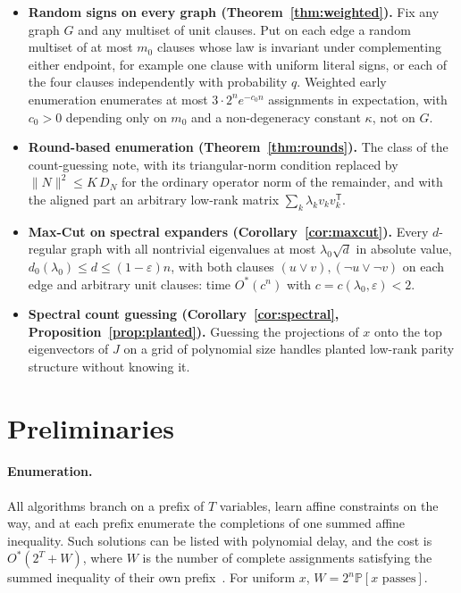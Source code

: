 \documentclass[11pt,a4paper]{article}
\theoremstyle{definition}
\theoremstyle{remark}
\newcommand{\Ostar}{O^{*}}
\newcommand{\Prb}{\mathbb P}
\begin{document}
\begin{itemize}
\item \textbf{Random signs on every graph (Theorem~\ref{thm:weighted}).} Fix
any graph $G$ and any multiset of unit clauses. Put on each edge a random
multiset of at most $m_0$ clauses whose law is invariant under complementing
either endpoint, for example one clause with uniform literal signs, or each of
the four clauses independently with probability $q$. Weighted early enumeration
enumerates at most $3\cdot2^ne^{-c_0n}$ assignments in expectation, with $c_0>0$
depending only on $m_0$ and a non-degeneracy constant $\kappa$, not on $G$.
\item \textbf{Round-based enumeration (Theorem~\ref{thm:rounds}).} The class of
the count-guessing note, with its triangular-norm condition replaced by
$\|N\|^2\le K\,D_N$ for the ordinary operator norm of the remainder, and with
the aligned part an arbitrary low-rank matrix $\sum_k\lambda_kv_kv_k^{\mathsf T}$.
\item \textbf{Max-Cut on spectral expanders (Corollary~\ref{cor:maxcut}).}
Every $d$-regular graph with all nontrivial eigenvalues at most $\lambda_0\sqrt d$
in absolute value, $d_0(\lambda_0)\le d\le(1-\varepsilon)n$, with both clauses
$(u\lor v),(\neg u\lor\neg v)$ on each edge and arbitrary unit clauses: time
$\Ostar(c^n)$ with $c=c(\lambda_0,\varepsilon)<2$.
\item \textbf{Spectral count guessing (Corollary~\ref{cor:spectral},
Proposition~\ref{prop:planted}).} Guessing the projections of $x$ onto the top
eigenvectors of $J$ on a grid of polynomial size handles planted low-rank parity
structure without knowing it.
\end{itemize}

\section{Preliminaries}\label{sec:prelim}

\paragraph{Enumeration.} All algorithms branch on a prefix of $T$ variables,
learn affine constraints on the way, and at each prefix enumerate the
completions of one summed affine inequality. Such solutions can be listed with
polynomial delay, and the cost is $\Ostar(2^T+W)$, where $W$ is the number of
complete assignments satisfying the summed inequality of their own
prefix~\cite{EE,Paper}. For uniform $x$, $W=2^n\Prb[x\text{ passes}]$.
\end{document}
